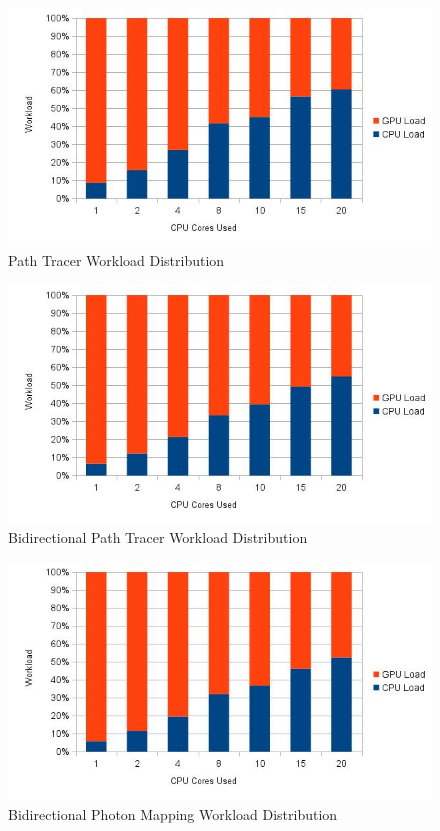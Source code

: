 \begin{figure}[H]
\includegraphics[width=\linewidth]{img/ptwl.jpg}
\caption{\label{img:ptwl} Path Tracer Workload Distribution}
\end{figure}

\begin{figure}[H]
\includegraphics[width=\linewidth]{img/bptwl.jpg}
\caption{\label{img:bptwl} Bidirectional Path Tracer Workload Distribution}
\end{figure}

\begin{figure}[H]
\includegraphics[width=\linewidth]{img/bpmwl.jpg}
\caption{\label{img:bpmwl} Bidirectional Photon Mapping Workload Distribution}
\end{figure}

